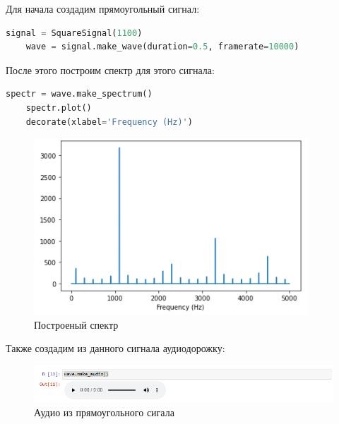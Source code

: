 \documentclass[a4paper]{article}
\begin{document}
            Для начала создадим прямоугольный сигнал:
            
\begin{lstlisting}[language=Python, caption= Построение прямоугольного сигнала]
    signal = SquareSignal(1100)
    wave = signal.make_wave(duration=0.5, framerate=10000)
\end{lstlisting}       
            
            После этого построим спектр для этого сигнала:
            
\begin{lstlisting}[language=Python, caption= Построение спектра]
    spectr = wave.make_spectrum()
    spectr.plot()
    decorate(xlabel='Frequency (Hz)')
\end{lstlisting}               
            
            \begin{figure}[H]
                \centering
                \includegraphics[width=\textwidth]{ex_3_square.png}
                \caption{Построеный спектр}
                \label{fig:ex_3_square}
            \end{figure}
            
            Также создадим из данного сигнала аудиодорожку:
            
            \begin{figure}[H]
                \centering
                \includegraphics[width=\textwidth]{ex_3_square_audio.png}
                \caption{Аудио из прямоугольного сигала}
                \label{fig:ex_3_square_audio}
            \end{figure}
            
\end{document}
